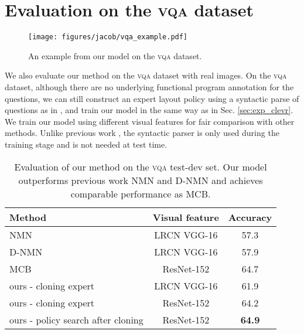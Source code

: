 \documentclass[10pt,twocolumn,letterpaper]{article}
\newcommand{\vqa}{\textsc{vqa}\xspace}
\begin{document}
\section{Evaluation on the \vqa dataset}
\label{sec:exp_vqa}

\begin{figure}
\centering
\texttt{[image: figures/jacob/vqa\_example.pdf]}\vspace{-0.2cm}
\caption{An example from our model on the \vqa dataset.}
\label{fig:vqa}
\vspace{-0.5cm}
\end{figure}

We also evaluate our method on the \vqa dataset \cite{antol15iccv} with real images. On the \vqa dataset, although there are no underlying functional program annotation for the questions, we can still construct an expert layout policy using a syntactic parse of questions as in \cite{andreas16neural,andreas2016learning}, and train our model in the same way as in Sec. \ref{sec:exp_clevr}. We train our model using different visual features for fair comparison with other methods. Unlike previous work \cite{andreas16neural,andreas2016learning}, the syntactic parser is only used during the training stage and is not needed at test time.

\begin{table}[t]
\small
\center
\begin{tabular}{lcc}
\toprule
  Method & Visual feature & Accuracy \\
  \hline
  NMN \cite{andreas16neural} & LRCN VGG-16 & 57.3 \\
  D-NMN \cite{andreas2016learning} & LRCN VGG-16 & 57.9 \\
  MCB \cite{fukui16emnlp} & ResNet-152 & 64.7 \\
  \hline
  ours - cloning expert & LRCN VGG-16  & 61.9 \\
  ours - cloning expert & ResNet-152 & 64.2 \\
  ours - policy search after cloning & ResNet-152 & \textbf{64.9} \\
\bottomrule
\end{tabular}\vspace{-0.2cm}
\caption{Evaluation of our method on the \vqa test-dev set. Our model outperforms previous work NMN and D-NMN and achieves comparable performance as MCB.}
\label{tab:results_vqa}
\vspace{-0.5cm}
\end{table}
\end{document}
